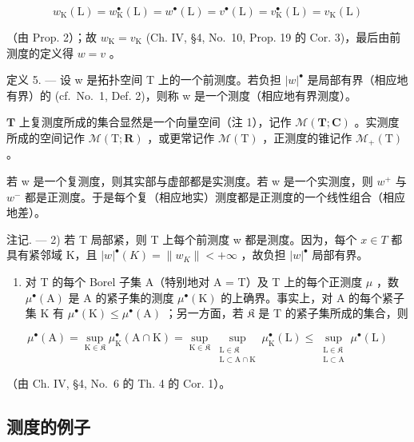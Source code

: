 \[
w _ {\mathrm{K}} (\mathrm{L}) = w _ {\mathrm{K}} ^ {\bullet} (\mathrm{L}) = w ^ {\bullet} (\mathrm{L}) = v ^ {\bullet} (\mathrm{L}) = v _ {\mathrm{K}} ^ {\bullet} (\mathrm{L}) = v _ {\mathrm{K}} (\mathrm{L})
\]

（由 Prop. 2）；故 \(w_{\mathrm{K}} = v_{\mathrm{K}}\) (Ch. IV, §4, No.~10, Prop. 19 的 Cor. 3)，最后由前测度的定义得 \(w = v\) 。

定义 5. --- 设 w 是拓扑空间 T 上的一个前测度。若负担 \(|w|^{\bullet}\) 是局部有界（相应地有界）的 (cf.~No.~1, Def. 2)，则称 w 是一个测度（相应地有界测度）。

\(\mathbf{T}\) 上复测度所成的集合显然是一个向量空间（注 1），记作 \(\mathcal{M}(\mathbf{T};\mathbf{C})\) 。实测度所成的空间记作 \(\mathcal{M}(\mathrm{T};\mathbf{R})\) ，或更常记作 \(\mathcal{M}(\mathrm{T})\) ，正测度的锥记作 \(\mathcal{M}_{+}(\mathrm{T})\) 。

若 w 是一个复测度，则其实部与虚部都是实测度。若 w 是一个实测度，则 \(w^{+}\) 与 \(w^{-}\) 都是正测度。于是每个复（相应地实）测度都是正测度的一个线性组合（相应地差）。

注记. --- 2) 若 T 局部紧，则 T 上每个前测度 w 都是测度。因为，每个 \(x \in T\) 都具有紧邻域 K，且 \(|w|^{\bullet}(K) = \|w_{K}\| < +\infty\) ，故负担 \(|w|^{\bullet}\) 局部有界。

\begin{enumerate}
\def\labelenumi{\arabic{enumi})}
\setcounter{enumi}{2}
\tightlist
\item
  对 T 的每个 Borel 子集 A（特别地对 A = T）及 T 上的每个正测度 \(\mu\) ，数 \(\mu^{\bullet}(\mathrm{A})\) 是 A 的紧子集的测度 \(\mu^{\bullet}(\mathrm{K})\) 的上确界。事实上，对 A 的每个紧子集 K 有 \(\mu^{\bullet}(\mathrm{K}) \leqslant \mu^{\bullet}(\mathrm{A})\) ；另一方面，若 \(\mathfrak{K}\) 是 T 的紧子集所成的集合，则
\end{enumerate}

\[
\mu^{\bullet}(\mathrm{A}) = \sup_{\mathrm{K}\in \mathfrak{K}}\mu_{\mathrm{K}}^{\bullet}(\mathrm{A}\cap \mathrm{K}) = \sup_{\mathrm{K}\in \mathfrak{K}}\sup_{\substack{\mathrm{L}\in \mathfrak{K}\\ \mathrm{L}\subset \mathrm{A}\cap \mathrm{K}}}\mu_{\mathrm{K}}^{\bullet}(\mathrm{L})\leqslant \sup_{\substack{\mathrm{L}\in \mathfrak{K}\\ \mathrm{L}\subset \mathrm{A}}}\mu^{\bullet}(\mathrm{L})
\]

（由 Ch. IV, §4, No.~6 的 Th. 4 的 Cor. 1）。

\subsection{测度的例子}

